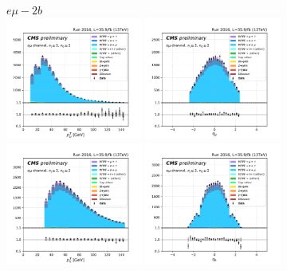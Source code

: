 \begin{figure}[ht]
    \centering
    $e\mu - 2b$ \\
    \includegraphics[width=0.4\textwidth]{chapters/Analysis/sectionPlots/figures/kinematics_pickles/emu2/2b/emu2_2b_lepton1_pt.pdf}
    \includegraphics[width=0.4\textwidth]{chapters/Analysis/sectionPlots/figures/kinematics_pickles/emu2/2b/emu2_2b_lepton1_eta.pdf}
    \includegraphics[width=0.4\textwidth]{chapters/Analysis/sectionPlots/figures/kinematics_pickles/emu2/2b/emu2_2b_lepton2_pt.pdf}
    \includegraphics[width=0.4\textwidth]{chapters/Analysis/sectionPlots/figures/kinematics_pickles/emu2/2b/emu2_2b_lepton2_eta.pdf}

\end{figure}
